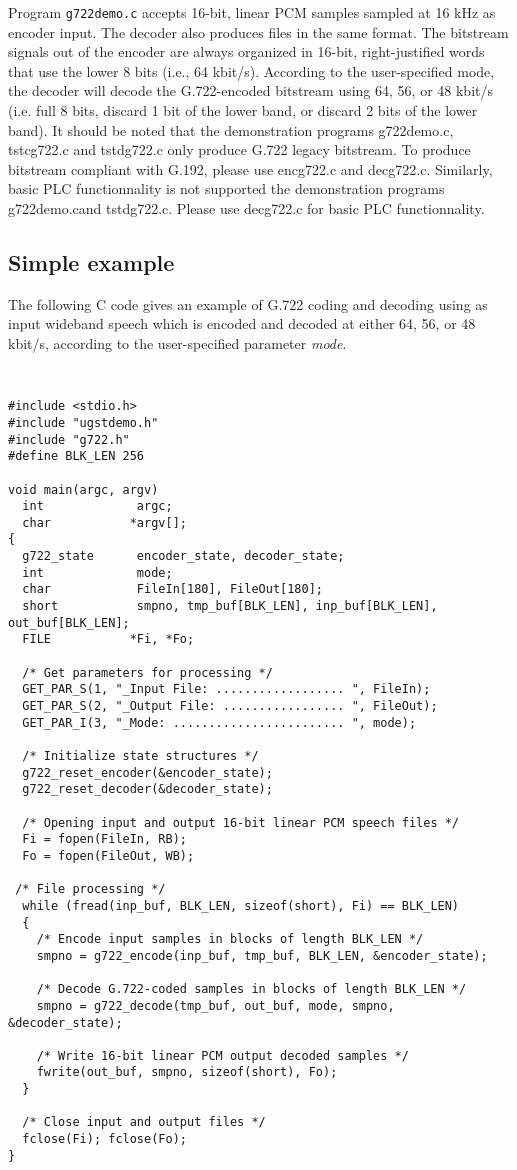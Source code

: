 Program {\tt g722demo.c} accepts 16-bit, linear PCM samples sampled at
16 kHz as encoder input. The decoder also produces files in the same
format. The bitstream signals out of the encoder are always organized
in 16-bit, right-justified words that use the lower 8 bits (i.e., 64
kbit/s). According to the user-specified mode, the decoder will decode
the G.722-encoded bitstream using 64, 56, or 48 kbit/s (i.e. full 8
bits, discard 1 bit of the lower band, or discard 2 bits of the lower
band). 
It should be noted that the demonstration programs g722demo.c, tstcg722.c and tstdg722.c only produce G.722 legacy bitstream. To produce bitstream compliant with G.192, please use encg722.c and decg722.c. Similarly, basic PLC functionnality is not supported the demonstration programs g722demo.cand tstdg722.c. Please use decg722.c for basic PLC functionnality.

\subsection {Simple example}

The following C code gives an example of G.722 coding and decoding
using as input wideband speech which is encoded and decoded at either
64, 56, or 48 kbit/s, according to the user-specified parameter
{\em mode}.
{\tt\small
\begin{verbatim}
#include <stdio.h>
#include "ugstdemo.h"
#include "g722.h"
#define BLK_LEN 256

void main(argc, argv)
  int             argc;
  char           *argv[];
{
  g722_state      encoder_state, decoder_state;
  int             mode;
  char            FileIn[180], FileOut[180];
  short           smpno, tmp_buf[BLK_LEN], inp_buf[BLK_LEN], out_buf[BLK_LEN];
  FILE           *Fi, *Fo;

  /* Get parameters for processing */
  GET_PAR_S(1, "_Input File: .................. ", FileIn);
  GET_PAR_S(2, "_Output File: ................. ", FileOut);
  GET_PAR_I(3, "_Mode: ........................ ", mode);

  /* Initialize state structures */
  g722_reset_encoder(&encoder_state);
  g722_reset_decoder(&decoder_state);

  /* Opening input and output 16-bit linear PCM speech files */
  Fi = fopen(FileIn, RB);
  Fo = fopen(FileOut, WB);

 /* File processing */
  while (fread(inp_buf, BLK_LEN, sizeof(short), Fi) == BLK_LEN)
  {
    /* Encode input samples in blocks of length BLK_LEN */
    smpno = g722_encode(inp_buf, tmp_buf, BLK_LEN, &encoder_state);

    /* Decode G.722-coded samples in blocks of length BLK_LEN */
    smpno = g722_decode(tmp_buf, out_buf, mode, smpno, &decoder_state);

    /* Write 16-bit linear PCM output decoded samples */
    fwrite(out_buf, smpno, sizeof(short), Fo);
  }

  /* Close input and output files */
  fclose(Fi); fclose(Fo);
}
\end{verbatim}
}

